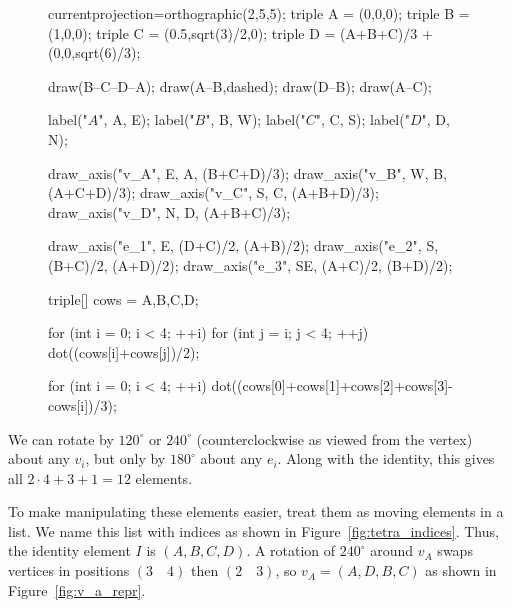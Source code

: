 \documentclass[../gatm_answers.tex]{subfiles}
\begin{document}
\begin{figure}[h]
	\begin{center}
		\begin{minipage}[b]{\textwidth}
			\centering
			\begin{asy}[width=0.5\textwidth]
			currentprojection=orthographic(2,5,5);
			triple A = (0,0,0);
			triple B = (1,0,0);
			triple C = (0.5,sqrt(3)/2,0);
			triple D = (A+B+C)/3 + (0,0,sqrt(6)/3);
			
			draw(B--C--D--A);
			draw(A--B,dashed);
			draw(D--B);
			draw(A--C);
			
			label("$A$", A, E);
			label("$B$", B, W);
			label("$C$", C, S);
			label("$D$", D, N);
			
			draw_axis("v_A", E, A, (B+C+D)/3);
			draw_axis("v_B", W, B, (A+C+D)/3);
			draw_axis("v_C", S, C, (A+B+D)/3);
			draw_axis("v_D", N, D, (A+B+C)/3);
			
			draw_axis("e_1", E, (D+C)/2, (A+B)/2);
			draw_axis("e_2", S, (B+C)/2, (A+D)/2);
			draw_axis("e_3", SE, (A+C)/2, (B+D)/2);
			
			triple[] cows = {A,B,C,D};
			
			for (int i = 0; i < 4; ++i) {
				for (int j = i; j < 4; ++j) {
					dot((cows[i]+cows[j])/2);
				}
			}
			
			for (int i = 0; i < 4; ++i) {
				dot((cows[0]+cows[1]+cows[2]+cows[3]-cows[i])/3);
			}
			
			\end{asy}
		\end{minipage}
	\end{center}
	\vspace*{-2\baselineskip}
	\begin{center}
		\begin{minipage}[t]{\textwidth}
			\label{fig:tetra_rot_axes}
		\end{minipage}
	\end{center}
	\vspace*{-2\baselineskip}
\end{figure}

\noindent We can rotate by $120^\circ$ or $240^\circ$ (counterclockwise as viewed from the vertex) about any $v_i$, but only by $180^\circ$ about any $e_i$. Along with the identity, this gives all $2\cdot 4+3+1=12$ elements.

To make manipulating these elements easier, treat them as moving elements in a list. We name this list with indices as shown in Figure~\ref{fig:tetra_indices}. Thus, the identity element $I$ is $(A,B,C,D)$. A rotation of $240^\circ$ around $v_A$ swaps vertices in positions $(3\quad 4)$ then $(2\quad 3)$, so $v_A=(A,D,B,C)$ as shown in Figure~\ref{fig:v_a_repr}.
\end{document}
